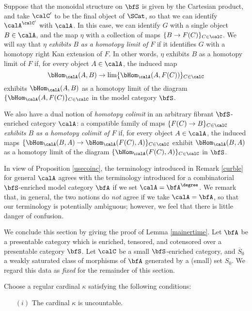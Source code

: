 \begin{Simplicial Categories}
\begin{remark}
Suppose that the monoidal structure on $\bfS$ is given by the Cartesian product, and take
$\calC'$ to be the final object of $\SCat$, so that we can identify $\calA^{\calC'}$ with $\calA$.
In this case, we can identify $G$ with a single object $B \in \calA$, and the map $\eta$ with
a collection of maps $ \{ B \rightarrow F(C) \}_{C \in \calC}$. We will say that $\eta$ 
{\it exhibits $B$ as a homotopy limit of $F$} if it identifies $G$ with a homotopy right Kan extension of $F$. In other words, $\eta$ exhibits $B$ as a homotopy limit of $F$ if, for every object
$A \in \calA$, the induced map
$$ \bHom_{\calA}(A,B) \rightarrow \lim \{ \bHom_{\calA}(A, F(C)) \}_{C \in \calC}$$
exhibits $\bHom_{\calA}(A,B)$ as a homotopy limit of the diagram
$\{ \bHom_{\calA}(A, F(C) \}_{C \in \calC}$ in the model category $\bfS$.

We also have a dual notion of {\em homotopy colimit} in an arbitrary fibrant
$\bfS$-enriched category $\calA$: a compatible family of maps $\{ F(C) \rightarrow B \}_{C \in \calC}$ {\it exhibits $B$ as a homotopy colimit of $F$} if, for every object $A \in \calA$, the
induced maps $\{ \bHom_{\calA}( B, A) \rightarrow \bHom_{\calA}( F(C), A) \}_{C \in \calC}$
exhibit $\bHom_{\calA}(B,A)$ as a homotopy limit of the diagram
$\{ \bHom_{\calA}( F(C), A) \}_{C \in \calC}$ in $\bfS$. 
\end{remark}

\begin{remark}
In view of Proposition \ref{usecoinc}, the terminology introduced in Remark \ref{curble} for general $\calA$ agrees with the terminology introduced for a combinatorial $\bfS$-enriched model category $\bfA$ if we set $\calA = \bfA^{\degree}$. We remark that, in general, the two notions do {\em not} agree if
we take $\calA = \bfA$, so that our terminology is potentially ambiguous; however, we feel that there is little danger of confusion.
\end{remark}

We conclude this section by giving the proof of Lemma \ref{mainertime}. 
Let $\bfA$ be a presentable category which is enriched, tensored, and cotensored over a presentable category $\bfS$. Let $\calC$ be a small $\bfS$-enriched category, and $\overline{S}_0$ a weakly saturated class of morphisms of $\bfA$ generated by a (small) set $S_0$. We regard this data as {\em fixed} for the remainder of this section.

Choose a regular cardinal $\kappa$ satisfying the following conditions:
\begin{itemize}
\item[$(i)$] The cardinal $\kappa$ is uncountable.


\end{itemize}
\end{Simplicial Categories}
